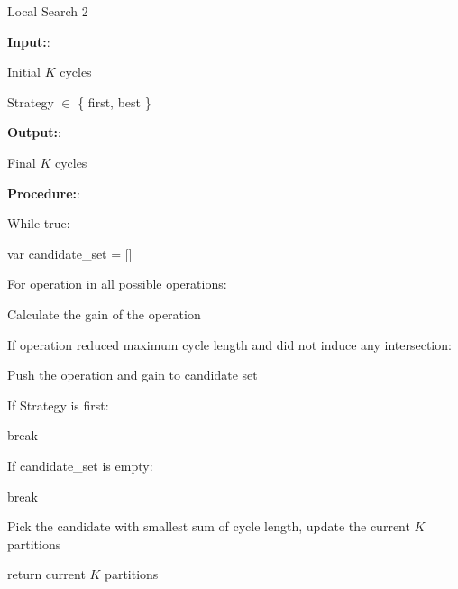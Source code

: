 \begin{algorithm}[H]
\caption{Local Search 2}
\label{algo:localsearch2}
\textbf{Input:}:

    Initial $K$ cycles
    
    Strategy $\in$ \{ first, best \} 

\textbf{Output:}:

    Final $K$ cycles
    
\textbf{Procedure:}:

While true:

    \hspace{1cm} var candidate\_set = []

    \hspace{1cm} For operation in all possible operations:
    
        \hspace{2cm} Calculate the gain of the operation
            
        \hspace{2cm} If operation reduced maximum cycle length and did not induce any intersection:
            
            \hspace{3cm} Push the operation and gain to candidate set
                
            \hspace{3cm} If Strategy is first:
                
                \hspace{4cm} break
                
    \hspace{1cm} If candidate\_set is empty:
    
        \hspace{2cm} break
    
    \hspace{1cm} Pick the candidate with smallest sum of cycle length, update the current $K$ partitions
    
return current $K$ partitions

\end{algorithm}